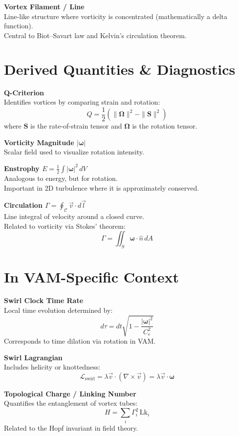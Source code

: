 \documentclass[12pt]{article}
\begin{document}
\medskip
\textbf{Vortex Filament / Line} \\
Line-like structure where vorticity is concentrated (mathematically a delta function). \\
Central to Biot–Savart law and Kelvin's circulation theorem.

\section*{Derived Quantities \& Diagnostics}

\textbf{Q-Criterion} \\
Identifies vortices by comparing strain and rotation:
\[
Q = \frac{1}{2} \left( \| \boldsymbol{\Omega} \|^2 - \| \mathbf{S} \|^2 \right)
\]
where \( \mathbf{S} \) is the rate-of-strain tensor and \( \boldsymbol{\Omega} \) is the rotation tensor.

\medskip
\textbf{Vorticity Magnitude \( |\boldsymbol{\omega}| \)} \\
Scalar field used to visualize rotation intensity.

\medskip
\textbf{Enstrophy \( E = \frac{1}{2} \int |\boldsymbol{\omega}|^2 \, dV \)} \\
Analogous to energy, but for rotation. \\
Important in 2D turbulence where it is approximately conserved.

\medskip
\textbf{Circulation \( \Gamma = \oint_{\mathcal{C}} \vec{v} \cdot d\vec{l} \)} \\
Line integral of velocity around a closed curve. \\
Related to vorticity via Stokes' theorem:
\[
\Gamma = \iint_S \boldsymbol{\omega} \cdot \hat{n} \, dA
\]

\section*{In VAM-Specific Context}

\textbf{Swirl Clock Time Rate} \\
Local time evolution determined by:
\[
d\tau = dt \sqrt{1 - \frac{|\boldsymbol{\omega}|^2}{C_e^2}}
\]
Corresponds to time dilation via rotation in VAM.

\medskip
\textbf{Swirl Lagrangian} \\
Includes helicity or knottedness:
\[
\mathcal{L}_{\text{swirl}} = \lambda \vec{v} \cdot (\nabla \times \vec{v}) = \lambda \vec{v} \cdot \boldsymbol{\omega}
\]

\medskip
\textbf{Topological Charge / Linking Number} \\
Quantifies the entanglement of vortex tubes:
\[
H = \sum_i \Gamma_i^2 \, \text{Lk}_i
\]
Related to the Hopf invariant in field theory.
\end{document}
